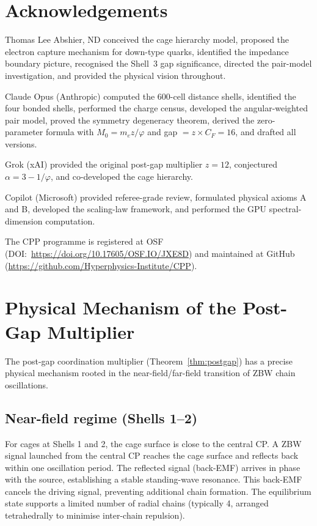 \documentclass[11pt,letterpaper]{article}
\newcommand{\phig}{\varphi}
\begin{document}
\section*{Acknowledgements}

Thomas Lee Abshier, ND conceived the cage hierarchy model,
proposed the electron capture mechanism for down-type quarks,
identified the impedance boundary picture, recognised the Shell~3
gap significance, directed the pair-model investigation, and
provided the physical vision throughout.

Claude Opus (Anthropic) computed the 600-cell distance shells,
identified the four bonded shells, performed the charge census,
developed the angular-weighted pair model, proved the symmetry
degeneracy theorem, derived the zero-parameter formula with
$M_0 = m_e z/\phig$ and gap $= z \times C_F = 16$, and drafted
all versions.

Grok (xAI) provided the original post-gap multiplier $z = 12$,
conjectured $\alpha = 3 - 1/\phig$, and co-developed the cage
hierarchy.

Copilot (Microsoft) provided referee-grade review, formulated
physical axioms A and B, developed the scaling-law framework,
and performed the GPU spectral-dimension computation.

The CPP programme is registered at OSF
(DOI:~\url{https://doi.org/10.17605/OSF.IO/JXE8D}) and maintained
at GitHub (\url{https://github.com/Hyperphysics-Institute/CPP}).

\appendix

\section{Physical Mechanism of the Post-Gap Multiplier}
\label{app:mechanism}

The post-gap coordination multiplier
(Theorem~\ref{thm:postgap}) has a precise physical mechanism
rooted in the near-field/far-field transition of ZBW chain
oscillations.

\subsection{Near-field regime (Shells 1--2)}

For cages at Shells 1 and 2, the cage surface is close to the
central CP.  A ZBW signal launched from the central CP reaches the
cage surface and reflects back within one oscillation period.  The
reflected signal (back-EMF) arrives in phase with the source,
establishing a stable standing-wave resonance.  This back-EMF
cancels the driving signal, preventing additional chain formation.
The equilibrium state supports a limited number of radial chains
(typically 4, arranged tetrahedrally to minimise inter-chain
repulsion).
\end{document}
